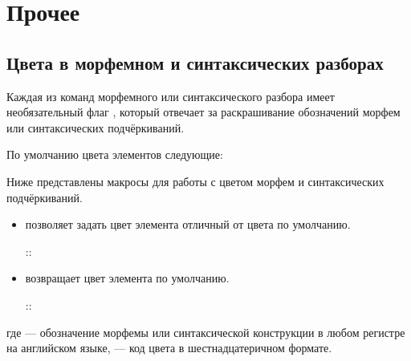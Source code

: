 \section{Прочее}

\subsection{Цвета в морфемном и синтаксических разборах}

Каждая из команд морфемного или синтаксического разбора имеет необязательный
флаг \rsKwarg[color], который отвечает за раскрашивание обозначений морфем
или синтаксических подчёркиваний.

По умолчанию цвета элементов следующие:



Ниже представлены макросы для работы с цветом морфем и синтаксических подчёркиваний.
\begin{itemize}
    \item
          \rsName[rsSetColor] позволяет задать цвет элемента отличный от цвета по
          умолчанию.
          \begin{tcolorbox}
              \rsModifier[cmd]
              {}::
              \rsName[rsSetColor]
          \end{tcolorbox}
    \item
          \rsName[rsResetColor] возвращает цвет элемента по умолчанию.
          \begin{tcolorbox}
              \rsModifier[cmd]
              {}::
          \end{tcolorbox}
\end{itemize}

где  --- обозначение морфемы или синтаксической конструкции в любом
регистре на английском языке,  --- код цвета в шестнадцатеричном формате.

